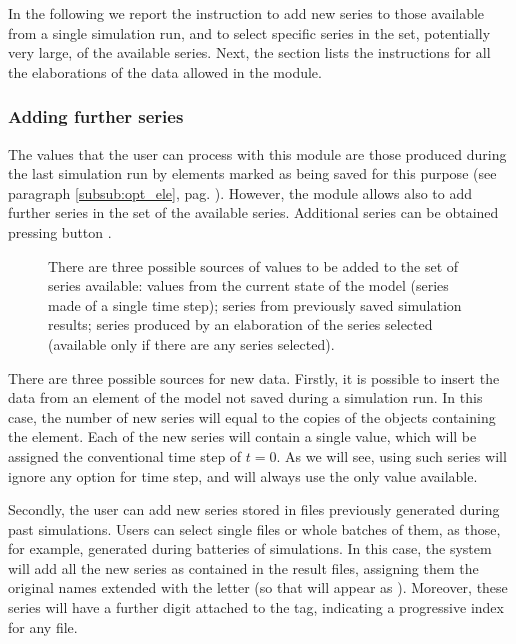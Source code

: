 \documentclass [11pt,a4paper] {book}
\begin{document}
In the following we report the instruction to add new series to those available from a single simulation run, and to select specific series in the set, potentially very large, of the available series. Next, the section lists the instructions for all the elaborations of the data allowed in the module.

\subsubsection{Adding further series}

The values that the user can process with this module are those produced during the last simulation run by elements marked as being saved for this purpose (see paragraph \ref{subsub:opt_ele}, pag. \pageref{subsub:opt_ele}). However, the module allows also to add further series in the set of the available series. Additional series can be obtained pressing button .


\begin{figure}[ht]
  \centering
  \caption{\small There are three possible sources of values to be added to the set of series available: values from the current state of the model (series made of a single time step); series from previously saved simulation results; series produced by an elaboration of the series selected (available only if there are any series selected).}
  \label{fig:add_series}
\end{figure}

There are three possible sources for new data. Firstly, it is possible to insert the data from an element of the model not saved during a simulation run. In this case, the number of new series will equal to the copies of the objects containing the element. Each of the new series will contain a single value, which will be assigned the conventional time step of $t=0$. As we will see, using such series will ignore any option for time step, and will always use the only value available.

Secondly, the user can add new series stored in files previously generated during past simulations. Users can select single files or whole batches of them, as those, for example, generated during batteries of simulations. In this case, the system will add all the new series as contained in the result files, assigning them the original names extended with the letter  (so that  will appear as ). Moreover, these series will have a further digit attached to the tag, indicating a progressive index for any file.
\end{document}
